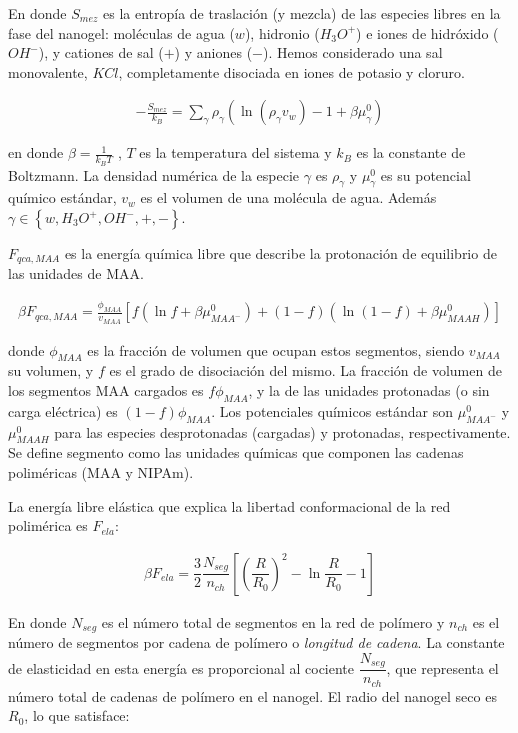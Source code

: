 	
	\noindent En donde $S_{mez}$ es la entrop\'ia de traslaci\'on (y mezcla) de las especies libres en la fase del nanogel: mol\'eculas de agua ($w$), hidronio ($H_3O^+$) e iones de hidr\'oxido ($OH^-$), y cationes de sal ($+$) y aniones ($-$).
	Hemos considerado una sal monovalente, $KCl$,  completamente disociada en iones de potasio y cloruro.
	
	\begin{align}
		-\frac{S_{mez}}{k_B}	= \sum_{\gamma} \rho_\gamma\left(\ln\left(\rho_\gamma v_w\right) -1 + \beta\mu^0_\gamma\right) 
	\end{align}
	
	\noindent en donde  $\beta=\frac{1}{k_BT}$ , $T$ es la temperatura del sistema  y  $k_B$ es la constante de Boltzmann. La densidad num\'erica de la especie $\gamma$ es $\rho_\gamma$ y $\mu^0_\gamma$ es su potencial qu\'imico est\'andar,  $v_w$ es el volumen de una mol\'ecula de agua. Adem\'as $\gamma \in \left\{ w, H_3O^+, OH^-, +,- \right\}$.
	
	$F_{qca,MAA}$ es la energ\'ia qu\'imica libre que describe la protonaci\'on de equilibrio de las unidades de MAA.
	
	
	\begin{align}
		\beta F_{qca, MAA} =  \frac{\phi_{MAA}}{v_{MAA}} \left[f(\ln f+ \beta\mu^0_{MAA^-}) +(1-f)(\ln (1-f)+\beta\mu^0_{MAAH})\right]
	\end{align}
	
	
	\noindent donde $\phi_{MAA}$ es la fracci\'on de volumen que ocupan estos segmentos, siendo $v_{MAA}$ su volumen, y $f$ es el grado de disociaci\'on del mismo. 
	La fracci\'on de volumen de los segmentos MAA cargados es $f\phi_{MAA}$, y la de las unidades protonadas (o sin carga el\'ectrica) es $(1-f)\phi_{MAA}$.
	Los potenciales qu\'imicos est\'andar son $\mu^0_{MAA^-}$ y $\mu^0_{MAAH}$ para las especies desprotonadas (cargadas) y protonadas, respectivamente.
	Se define segmento como las unidades qu\'imicas que componen las cadenas polim\'ericas (MAA y NIPAm).
	
	
	La energ\'ia libre el\'astica que explica la libertad conformacional de la red polim\'erica es $F_{ela}$: 
	
	\begin{align}
		\beta F_{ela} = \dfrac{3}{2}\dfrac{N_{seg}}{n_{ch} }\left[\left(\dfrac{R}{R_0}\right)^2 - \ln\dfrac{R}{R_0} -1\right]
	\end{align}
	
	En donde $N_{seg}$ es el n\'umero total de segmentos en la red de pol\'imero y $n_{ch}$ es el n\'umero de segmentos por cadena de pol\'imero o \emph{longitud de cadena}.
	La constante de elasticidad en esta energ\'ia es proporcional al cociente $\dfrac{N_{seg}}{n_{ch}}$, que representa el n\'umero total de cadenas de pol\'imero en el nanogel.
	El radio del nanogel seco es $R_0$, lo que satisface:
	
